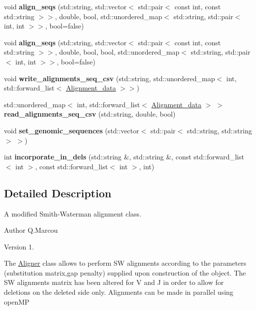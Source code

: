 \begin{DoxyCompactItemize}
void {\bfseries align\+\_\+seqs} (std\+::string, std\+::vector$<$ std\+::pair$<$ const int, const std\+::string $>$$>$, double, bool, std\+::unordered\+\_\+map$<$ std\+::string, std\+::pair$<$ int, int $>$$>$, bool=false)
\item 
\mbox{\label{classAligner_aa85ef1888654fb387b181678207c1305}} 
void {\bfseries align\+\_\+seqs} (std\+::string, std\+::vector$<$ std\+::pair$<$ const int, const std\+::string $>$$>$, double, bool, bool, std\+::unordered\+\_\+map$<$ std\+::string, std\+::pair$<$ int, int $>$$>$, bool=false)
\item 
\mbox{\label{classAligner_a444f4cd823b3986622e3dc67aaa0f1b9}} 
void {\bfseries write\+\_\+alignments\+\_\+seq\+\_\+csv} (std\+::string, std\+::unordered\+\_\+map$<$ int, std\+::forward\+\_\+list$<$ \hyperlink{structAlignment__data}{Alignment\+\_\+data} $>$$>$)
\item 
\mbox{\label{classAligner_a9f1f8ad19d817606f631b3774f4ebb26}} 
std\+::unordered\+\_\+map$<$ int, std\+::forward\+\_\+list$<$ \hyperlink{structAlignment__data}{Alignment\+\_\+data} $>$ $>$ {\bfseries read\+\_\+alignments\+\_\+seq\+\_\+csv} (std\+::string, double, bool)
\item 
\mbox{\label{classAligner_ae497684fa0f8f48f973f39d13bdb32b3}} 
void {\bfseries set\+\_\+genomic\+\_\+sequences} (std\+::vector$<$ std\+::pair$<$ std\+::string, std\+::string $>$ $>$)
\item 
\mbox{\label{classAligner_a76cc0d616dbb84b6a777d16e60036b3a}} 
int {\bfseries incorporate\+\_\+in\+\_\+dels} (std\+::string \&, std\+::string \&, const std\+::forward\+\_\+list$<$ int $>$, const std\+::forward\+\_\+list$<$ int $>$, int)
\end{DoxyCompactItemize}


\subsection{Detailed Description}
A modified Smith-\/\+Waterman alignment class. 

\begin{DoxyAuthor}{Author}
Q.\+Marcou 
\end{DoxyAuthor}
\begin{DoxyVersion}{Version}
1.
\end{DoxyVersion}
The \hyperlink{classAligner}{Aligner} class allows to perform SW alignments according to the parameters (substitution matrix,gap penalty) supplied upon construction of the object. The SW alignments matrix has been altered for V and J in order to allow for deletions on the deleted side only. Alignments can be made in parallel using open\+MP 

